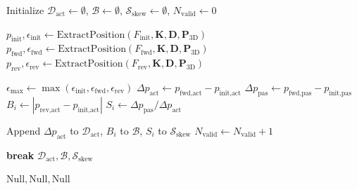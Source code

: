 \begin{algorithm}[t]
	\caption{Kinematic Parameter Extraction and Compensation}
	\label{alg:kompensasi}
	\begin{algorithmic}[1]
		\footnotesize
		
		\State Initialize $\mathcal{D}_{\text{act}} \gets \emptyset$, $\mathcal{B} \gets \emptyset$, $\mathcal{S}_{\text{skew}} \gets \emptyset$, $N_{\text{valid}} \gets 0$
		
		\State $p_{\text{init}}, \epsilon_{\text{init}} \gets \text{ExtractPosition}(F_{\text{init}}, \mathbf{K}, \mathbf{D}, \mathbf{P}_{3\text{D}})$
		\State $p_{\text{fwd}}, \epsilon_{\text{fwd}} \gets \text{ExtractPosition}(F_{\text{fwd}}, \mathbf{K}, \mathbf{D}, \mathbf{P}_{3\text{D}})$
		\State $p_{\text{rev}}, \epsilon_{\text{rev}} \gets \text{ExtractPosition}(F_{\text{rev}}, \mathbf{K}, \mathbf{D}, \mathbf{P}_{3\text{D}})$
		
		\State $\epsilon_{\text{max}} \gets \max(\epsilon_{\text{init}}, \epsilon_{\text{fwd}}, \epsilon_{\text{rev}})$
		\State $\Delta p_{\text{act}} \gets p_{\text{fwd,act}} - p_{\text{init,act}}$
		\State $\Delta p_{\text{pas}} \gets p_{\text{fwd,pas}} - p_{\text{init,pas}}$
		\State $B_i \gets |p_{\text{rev,act}} - p_{\text{init,act}}|$
		\State $S_i \gets \Delta p_{\text{pas}} / \Delta p_{\text{act}}$
		
		\State Append $\Delta p_{\text{act}}$ to $\mathcal{D}_{\text{act}}$, $B_i$ to $\mathcal{B}$, $S_i$ to $\mathcal{S}_{\text{skew}}$
		\State $N_{\text{valid}} \gets N_{\text{valid}} + 1$
		
		\State \textbf{break}
		\EndIf
		\EndIf
		\EndFor
		\State \Return $\mathcal{D}_{\text{act}}, \mathcal{B}, \mathcal{S}_{\text{skew}}$
		\EndFunction
		
		\Statex
		
		\State \Return $\text{Null}, \text{Null}, \text{Null}$
		\EndIf
		

\end{algorithmic}
\end{algorithm}
